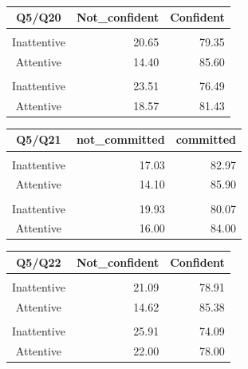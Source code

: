 \documentclass[
  11pt,
  a4paper,
]{article}
\begin{document}
\endgroup

\begingroup
\fontsize{12.0pt}{14.4pt}\selectfont

\begin{longtable}{crr}

\caption{\label{tbl-q5q20}}

\tabularnewline

\toprule
Q5/Q20 & Not\_confident & Confident \\ 
\midrule\addlinespace[2.5pt]
\multicolumn{3}{l}{{\bfseries Treatment}} \\[2.5pt] 
\midrule\addlinespace[2.5pt]
Inattentive & 20.65 & 79.35 \\ 
Attentive & 14.40 & 85.60 \\ 
\midrule\addlinespace[2.5pt]
\multicolumn{3}{l}{{\bfseries Control}} \\[2.5pt] 
\midrule\addlinespace[2.5pt]
Inattentive & 23.51 & 76.49 \\ 
Attentive & 18.57 & 81.43 \\ 
\bottomrule

\end{longtable}

\endgroup

\begingroup
\fontsize{12.0pt}{14.4pt}\selectfont
\begin{longtable*}{crr}
\toprule
Q5/Q21 & not\_committed & committed \\ 
\midrule\addlinespace[2.5pt]
 \\[2.5pt] 
\midrule\addlinespace[2.5pt]
Inattentive & 17.03 & 82.97 \\ 
Attentive & 14.10 & 85.90 \\ 
\midrule\addlinespace[2.5pt]
 \\[2.5pt] 
\midrule\addlinespace[2.5pt]
Inattentive & 19.93 & 80.07 \\ 
Attentive & 16.00 & 84.00 \\ 
\bottomrule
\end{longtable*}
\endgroup

\begingroup
\fontsize{12.0pt}{14.4pt}\selectfont
\begin{longtable*}{crr}
\toprule
Q5/Q22 & Not\_confident & Confident \\ 
\midrule\addlinespace[2.5pt]
 \\[2.5pt] 
\midrule\addlinespace[2.5pt]
Inattentive & 21.09 & 78.91 \\ 
Attentive & 14.62 & 85.38 \\ 
\midrule\addlinespace[2.5pt]
 \\[2.5pt] 
\midrule\addlinespace[2.5pt]
Inattentive & 25.91 & 74.09 \\ 
Attentive & 22.00 & 78.00 \\ 
\bottomrule
\end{longtable*}
\endgroup
\end{document}

